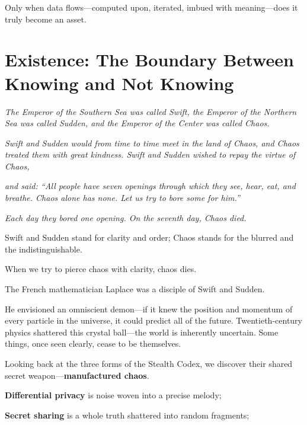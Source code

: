 Only when data flows---computed upon, iterated, imbued with meaning---does it truly become an asset.


\newpage
\section{Existence: The Boundary Between Knowing and Not Knowing}

\begin{myquote}
\textit{The Emperor of the Southern Sea was called Swift, the Emperor of the Northern Sea was called Sudden, and the Emperor of the Center was called Chaos.}

\textit{Swift and Sudden would from time to time meet in the land of Chaos, and Chaos treated them with great kindness. Swift and Sudden wished to repay the virtue of Chaos,}

\textit{and said: ``All people have seven openings through which they see, hear, eat, and breathe. Chaos alone has none. Let us try to bore some for him.''}

\textit{Each day they bored one opening. On the seventh day, Chaos died.}
\end{myquote}


Swift and Sudden stand for clarity and order;
Chaos stands for the blurred and the indistinguishable.

When we try to pierce chaos with clarity, chaos dies.

\vspace{1em}

The French mathematician Laplace was a disciple of Swift and Sudden.

He envisioned an omniscient demon---if it knew the position and momentum of every particle in the universe, it could predict all of the future.
Twentieth-century physics shattered this crystal ball---the world is inherently uncertain.
Some things, once seen clearly, cease to be themselves.

\vspace{1em}

Looking back at the three forms of the Stealth Codex, we discover their shared secret weapon---\textbf{manufactured chaos}.

\textbf{Differential privacy} is noise woven into a precise melody;

\textbf{Secret sharing} is a whole truth shattered into random fragments;

